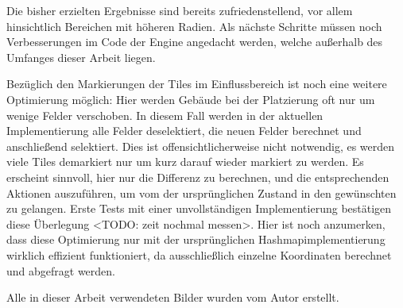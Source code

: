 \documentclass[%
			paper=a4,%
			DIV12,
			liststotoc,
			bibtotoc,
			draft=false,%
			titlepage,
			numbers=noendperiod
			]{scrartcl}
\begin{document}
Die bisher erzielten Ergebnisse sind bereits zufriedenstellend, vor allem hinsichtlich Bereichen mit höheren Radien. Als nächste Schritte müssen noch Verbesserungen im Code der Engine angedacht werden, welche außerhalb des Umfanges dieser Arbeit liegen.

Bezüglich den Markierungen der Tiles im Einflussbereich ist noch eine weitere Optimierung möglich:
Hier werden Gebäude bei der Platzierung oft nur um wenige Felder verschoben.
In diesem Fall werden in der aktuellen Implementierung alle Felder deselektiert, die neuen Felder berechnet und anschließend selektiert.
Dies ist offensichtlicherweise nicht notwendig, es werden viele Tiles demarkiert nur um kurz darauf wieder markiert zu werden. 
Es erscheint sinnvoll, hier nur die Differenz zu berechnen, und die entsprechenden Aktionen auszuführen, um vom der ursprünglichen Zustand in den gewünschten zu gelangen.
Erste Tests mit einer unvollständigen Implementierung bestätigen diese Überlegung <TODO: zeit nochmal messen>. 
Hier ist noch anzumerken, dass diese Optimierung nur mit der ursprünglichen Hashmapimplementierung wirklich effizient funktioniert, da ausschließlich einzelne Koordinaten berechnet und abgefragt werden. 


\clearpage

\newpage

\listoffigures

Alle in dieser Arbeit verwendeten Bilder wurden vom Autor erstellt.

\lstlistoflistings

\listoftables

\newpage

\nocite{*} %

\end{document}
